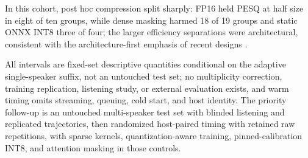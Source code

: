 In this cohort, post hoc compression split sharply: FP16 held PESQ at
half size in eight of ten groups, while dense masking harmed 18 of 19
groups and static ONNX INT8 three of four; the larger efficiency
separations were architectural, consistent with the architecture-first
emphasis of recent designs
\citep{siuzdak2024vocos,liu2025rfwave,lee2025periodwave,oh2026comvo}.

All intervals are fixed-set descriptive quantities conditional on the
adaptive single-speaker suffix, not an untouched test set; no
multiplicity correction, training replication, listening study, or
external evaluation exists, and warm timing omits streaming, queuing,
cold start, and host identity.  The priority follow-up is an untouched
multi-speaker test set with blinded listening and replicated
trajectories, then randomized host-paired timing with retained raw
repetitions, with sparse kernels, quantization-aware training,
pinned-calibration INT8, and attention masking in those controls.
